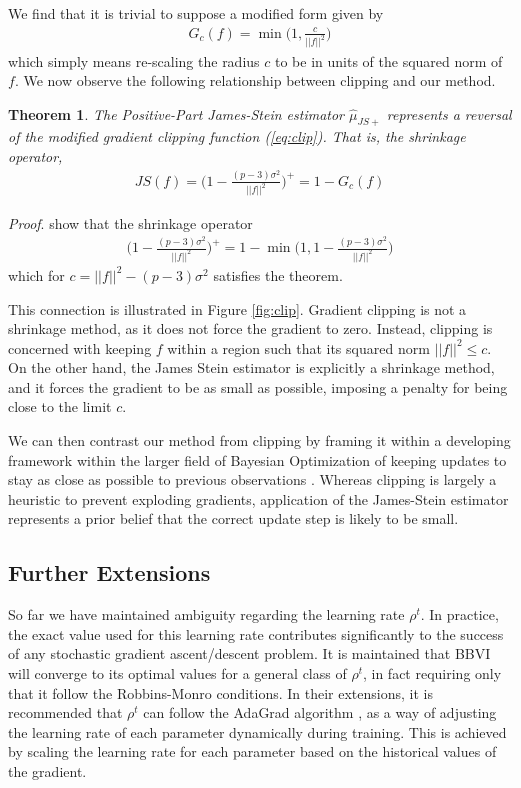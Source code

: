 \documentclass{article}
\newtheorem{theorem}{Theorem}
\begin{document}
We find that it is trivial to suppose a modified form given by
\begin{align}
    \label{eq:clip}
    G_c(f) = \min\bigg(1, \frac{c}{||f||^2} \bigg)
\end{align}
which simply means re-scaling the radius $c$ to be in units of the squared norm of $f$. We now observe the following relationship between clipping and our method.
\begin{theorem}
    The Positive-Part James-Stein estimator $\hat\mu_{JS+}$ represents a reversal of the modified gradient clipping function (\ref{eq:clip}). That is, the shrinkage operator,
    \begin{align*}
        JS(f) = \bigg(1 - \frac{(p-3) \sigma^2}{|| f ||^2} \bigg)^+ = 1 - G_c(f)
    \end{align*}
\end{theorem}

\textit{Proof}. \cite{Efron-1973} show that the shrinkage operator
\begin{align*}
    \bigg(1 - \frac{(p-3) \sigma^2}{|| f ||^2} \bigg)^+ = 1 - \min\bigg(1, 1 - \frac{(p-3) \sigma^2}{|| f ||^2} \bigg)
\end{align*}
which for $c = || f ||^2 - (p-3) \sigma^2$ satisfies the theorem.

This connection is illustrated in Figure \ref{fig:clip}. Gradient clipping is not a shrinkage method, as it does not force the gradient to zero. Instead, clipping is concerned with keeping $f$ within a region such that its squared norm $||f||^2 \leq c$. On the other hand, the James Stein estimator is explicitly a shrinkage method, and it forces the gradient to be as small as possible, imposing a penalty for being close to the limit $c$.

We can then contrast our method from clipping by framing it within a developing framework within the larger field of Bayesian Optimization \cite{Garnett-2023} of keeping updates to stay as close as possible to previous observations \cite{Li-2019}. Whereas clipping is largely a heuristic to prevent exploding gradients, application of the James-Stein estimator represents a prior belief that the correct update step is likely to be small.

\subsection{Further Extensions}
\label{sec:extend}

So far we have maintained ambiguity regarding the learning rate $\rho^t$. In practice, the exact value used for this learning rate contributes significantly to the success of any stochastic gradient ascent/descent problem. It is maintained \cite{Ranganath-2014} that BBVI will converge to its optimal values for a general class of $\rho^t$, in fact requiring only that it follow the Robbins-Monro \cite{Robbins-1951} conditions. In their extensions, it is recommended that $\rho^t$ can follow the AdaGrad algorithm \cite{Duchi-2011, Goodfellow-2016}, as a way of adjusting the learning rate of each parameter dynamically during training. This is achieved by scaling the learning rate for each parameter based on the historical values of the gradient.
\end{document}
